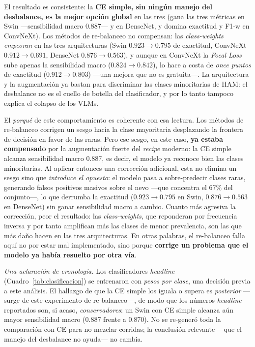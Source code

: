 \documentclass[11pt, a4paper]{article}
\begin{document}
El resultado es consistente: la \textbf{CE simple, sin ningún manejo del desbalance, es la mejor opción
global} en las tres (gana las tres métricas en Swin —sensibilidad macro $0.887$— y en DenseNet, y domina
exactitud y F1-w en ConvNeXt). Los métodos de re-balanceo no compensan: las \emph{class-weights}
\emph{empeoran} en las tres arquitecturas (Swin $0.923\to0.795$ de exactitud, ConvNeXt $0.912\to0.691$,
DenseNet $0.876\to0.563$), y aunque en ConvNeXt la \emph{Focal Loss} sube apenas la sensibilidad macro
($0.824\to0.842$), lo hace a costa de \emph{once puntos} de exactitud ($0.912\to0.803$) —una mejora que no
es gratuita—. La arquitectura y la augmentación ya bastan para discriminar
las clases minoritarias de HAM: el desbalance no es el cuello de botella del clasificador, y por lo tanto
tampoco explica el colapso de los VLMs.

El \emph{porqué} de este comportamiento es coherente con esa lectura. Los métodos de re-balanceo corrigen
un sesgo hacia la clase mayoritaria desplazando la frontera de decisión en favor de las raras. Pero ese
sesgo, en este caso, \textbf{ya estaba compensado} por la augmentación fuerte del \emph{recipe} moderno:
la CE simple alcanza sensibilidad macro $0.887$, es decir, el modelo ya reconoce bien las clases
minoritarias. Al aplicar entonces una corrección adicional, esta no elimina un sesgo sino que
\emph{introduce el opuesto}: el modelo pasa a sobre-predecir clases raras, generando falsos positivos
masivos sobre el nevo —que concentra el $67\%$ del conjunto—, lo que derrumba la exactitud ($0.923 \to
0.795$ en Swin, $0.876 \to 0.563$ en DenseNet) sin ganar sensibilidad macro a cambio. Cuanto más agresiva
la corrección, peor el resultado: las \emph{class-weights}, que reponderan por frecuencia inversa y por
tanto amplifican más las clases de menor prevalencia, son las que más daño hacen en las tres arquitecturas.
En otras palabras, el re-balanceo falla aquí no por estar mal implementado, sino porque \textbf{corrige un
problema que el modelo ya había resuelto por otra vía}.

\emph{Una aclaración de cronología.} Los clasificadores \emph{headline} (Cuadro~\ref{tab:clasificacion})
se entrenaron con \emph{pesos por clase}, una decisión previa a este análisis. El hallazgo de que la CE
simple los iguala o supera es \emph{posterior} —surge de este experimento de re-balanceo—, de modo que los
números \emph{headline} reportados son, si acaso, \emph{conservadores}: un Swin con CE simple alcanza aún
mayor sensibilidad macro ($0.887$ frente a $0.870$). No se re-generó toda la comparación con CE para no
mezclar corridas; la conclusión relevante —que el manejo del desbalance no ayuda— no cambia.
\end{document}
